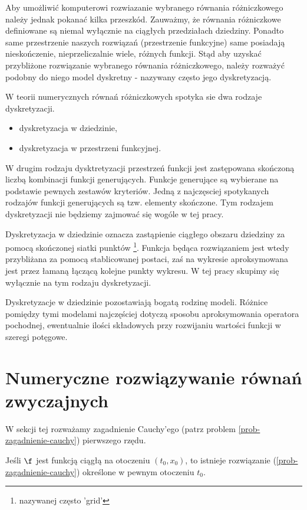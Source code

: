 \documentclass[12pt,a4paper]{report}
\begin{document}
\begin{example}
Aby umożliwić komputerowi rozwiazanie wybranego równania różniczkowego należy jednak pokanać kilka przeszkód. Zauważmy, że równania różniczkowe definiowane są niemal wyłącznie na ciągłych przedziałach dziedziny. Ponadto same przestrzenie naszych rozwiązań (przestrzenie funkcyjne) same posiadają nieskończenie, nieprzeliczalnie wiele, różnych funkcji. Stąd aby uzyskać przybliżone rozwiązanie wybranego równania różniczkowego, należy rozważyć podobny do niego model dyskretny - nazywany często jego dyskretyzacją. 

W teorii numerycznych równań różniczkowych spotyka sie dwa rodzaje dyskretyzacji.
\begin{itemize}
\item dyskretyzacja w dziedzinie,
\item dyskretyzacja w przestrzeni funkcyjnej.
\end{itemize}

W drugim rodzaju dysktretyzacji przestrzeń funkcji jest zastępowana skończoną liczbą kombinacji funkcji generujących. Funkcje generujące są wybierane na podstawie pewnych zestawów kryteriów. Jedną z najczęsciej spotykanych rodzajów funkcji generujących są tzw. elementy skończone. Tym rodzajem dyskretyzacji nie będziemy zajmować się wogóle w tej pracy.

Dyskretyzacja w dziedzinie oznacza zastąpienie ciągłego obszaru dziedziny za pomocą skończonej siatki punktów \footnote{nazywanej często 'grid'}. Funkcja będąca rozwiązaniem jest wtedy przybliżana za pomocą stablicowanej postaci, zaś na wykresie aproksymowana jest przez łamaną łączącą kolejne punkty wykresu. W tej pracy skupimy się wyłącznie na tym rodzaju dyskretyzacji. 

Dyskretyzacje w dziedzinie pozostawiają bogatą rodzinę modeli. Różnice pomiędzy tymi modelami najczęściej dotyczą sposobu aproksymowania operatora pochodnej, ewentualnie ilości składowych przy rozwijaniu wartości funkcji w szeregi potęgowe. 


\section{Numeryczne rozwiązywanie równań zwyczajnych}

W sekcji tej rozważamy zagadnienie Cauchy'ego (patrz problem \ref{prob-zagadnienie-cauchy}) pierwszego rzędu. 


\begin{theorem}[Peano]
Jeśli $\f$ jest funkcją ciągłą na otoczeniu $(t_{0},x_{0})$, to istnieje rozwiązanie (\ref{prob-zagadnienie-cauchy}) określone w pewnym otoczeniu $t_{0}$. 
\end{theorem}


\end{example}
\end{document}
